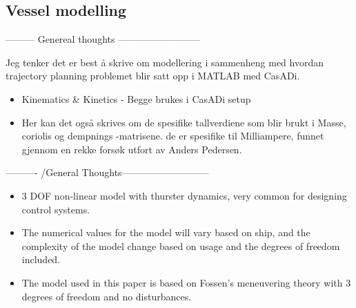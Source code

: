\subsection{Vessel modelling}
--------- Genereal thoughts --------------------------

Jeg tenker det er best å skrive om modellering i sammenheng med hvordan trajectory planning problemet blir satt opp i MATLAB med CasADi.
\begin{itemize}
    \item Kinematics \& Kinetics -\> Begge brukes i CasADi setup
    \item Her kan det også skrives om de spesifike tallverdiene som blir brukt i Masse, coriolis og dempnings -matrisene.
    de er spesifike til Milliampere, funnet gjennom en rekke forsøk utfort av Anders Pedersen.
\end{itemize}
---------- /General Thoughts--------------------------- 

\begin{itemize}
    \item 3 \gls{DOF} non-linear model with thurster dynamics, very common for designing control systems.
    \item The numerical values for the model will vary based on ship, and the complexity of the model change based on usage and the degrees of freedom included.
    \item The model used in this paper is based on Fossen's meneuvering theory with 3 degrees of freedom and no disturbances.
\end{itemize}

